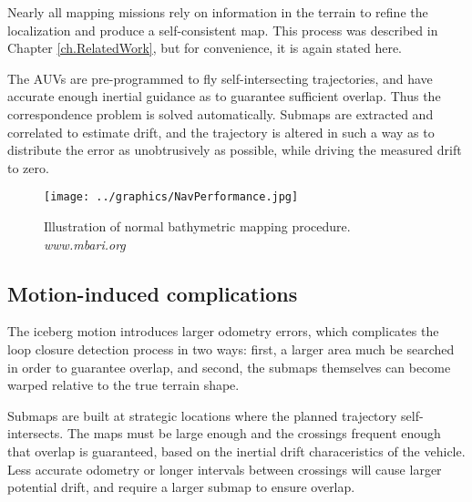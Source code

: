Nearly all mapping missions rely on information in the terrain to refine the localization and produce a self-consistent map. This process was described in Chapter \ref{ch.RelatedWork}, but for convenience, it is again stated here.

The AUVs are pre-programmed to fly self-intersecting trajectories, and have accurate enough inertial guidance as to guarantee sufficient overlap. Thus the correspondence problem is solved automatically. Submaps are extracted and correlated to estimate drift, and the trajectory is altered in such a way as to distribute the error as unobtrusively as possible, while driving the measured drift to zero.

 \begin{figure}[htbp]
   \centering
   \texttt{[image: ../graphics/NavPerformance.jpg]} %
   \caption{Illustration of normal bathymetric mapping procedure. \emph{www.mbari.org} }
   \label{fig:BathyMapping2}
\end{figure}



\subsection{Motion-induced complications}

The iceberg motion introduces larger odometry errors, which complicates the loop closure detection process in two ways: first, a larger area much be searched in order to guarantee overlap, and second, the submaps themselves can become warped relative to the true terrain shape.


Submaps are built at strategic locations where the planned trajectory self-intersects. The maps must be large enough and the crossings frequent enough that overlap is guaranteed, based on the inertial drift characeristics of the vehicle. Less accurate odometry or longer intervals between crossings will cause larger potential drift, and require a larger submap to ensure overlap. 

